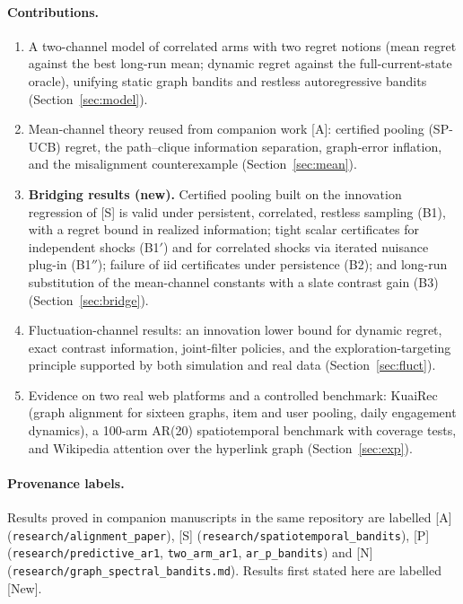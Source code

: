 \documentclass[11pt]{article}
\theoremstyle{definition}
\theoremstyle{remark}
\newcommand{\src}[1]{\textsf{[#1]}}
\begin{document}
\paragraph{Contributions.}
\begin{enumerate}
\item A two-channel model of correlated arms with two regret notions (mean regret against the best long-run mean; dynamic regret against the full-current-state oracle), unifying static graph bandits and restless autoregressive bandits (Section~\ref{sec:model}).
\item Mean-channel theory reused from companion work \src{A}: certified pooling (SP-UCB) regret, the path--clique information separation, graph-error inflation, and the misalignment counterexample (Section~\ref{sec:mean}).
\item \textbf{Bridging results (new).} Certified pooling built on the innovation regression of \src{S} is valid under persistent, correlated, restless sampling (B1), with a regret bound in realized information; tight scalar certificates for independent shocks (B1$'$) and for correlated shocks via iterated nuisance plug-in (B1$''$); failure of iid certificates under persistence (B2); and long-run substitution of the mean-channel constants with a slate contrast gain (B3) (Section~\ref{sec:bridge}).
\item Fluctuation-channel results: an innovation lower bound for dynamic regret, exact contrast information, joint-filter policies, and the exploration-targeting principle supported by both simulation and real data (Section~\ref{sec:fluct}).
\item Evidence on two real web platforms and a controlled benchmark: KuaiRec (graph alignment for sixteen graphs, item and user pooling, daily engagement dynamics), a 100-arm AR(20) spatiotemporal benchmark with coverage tests, and Wikipedia attention over the hyperlink graph (Section~\ref{sec:exp}).
\end{enumerate}

\paragraph{Provenance labels.} Results proved in companion manuscripts in the same repository are labelled \src{A} (\texttt{research/alignment\_paper}), \src{S} (\texttt{research/spatiotemporal\_bandits}), \src{P} (\texttt{research/predictive\_ar1}, \texttt{two\_arm\_ar1}, \texttt{ar\_p\_bandits}) and \src{N} (\texttt{research/graph\_spectral\_bandits.md}). Results first stated here are labelled \src{New}.
\end{document}

